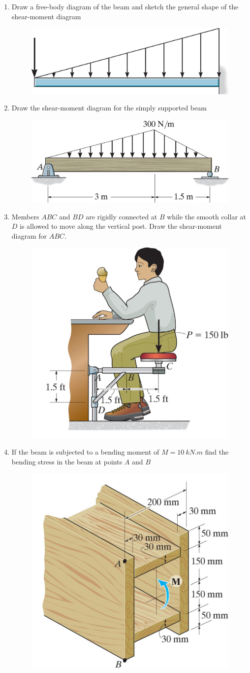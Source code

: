 \documentclass[12pt, oneside]{article}
\begin{document}
\begin{enumerate}
	\item %
		Draw a free-body diagram of the beam and sketch the general shape of the shear-moment diagram
		\begin{figure}[H]
			\centering
			\includegraphics[width=0.6\linewidth]{p6-1f}
		\end{figure}
	\item %
		Draw the shear-moment diagram for the simply supported beam
		\begin{figure}[H]
			\centering
			\includegraphics[width=0.6\linewidth]{6-4}
		\end{figure}
	\item %
		Members $ABC$ and $BD$ are rigidly connected at $B$ while the smooth collar at $D$ is allowed to move along the vertical post.
		Draw the shear-moment diagram for $ABC$.
		\begin{figure}[H]
			\centering
			\includegraphics[width=0.3\linewidth]{6-15}
		\end{figure}
		\newpage
	\item %
		If the beam is subjected to a bending moment of $M=\SI{10}{kN.m}$ find the bending stress in the beam at points $A$ and $B$
		\begin{figure}[H]
			\centering
			\includegraphics[width=0.5\linewidth]{f6-12}

\end{figure}
\end{enumerate}
\end{document}

